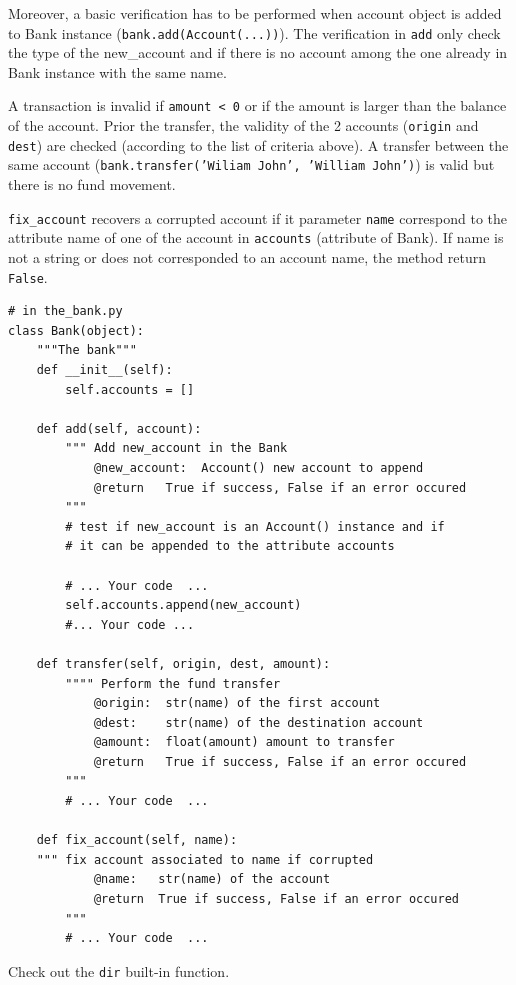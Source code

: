 \documentclass{42-en}
\begin{document}
Moreover, a basic verification has to be performed when account object is added to Bank instance
(\texttt{bank.add(Account(...))}).
The verification in \texttt{add} only check the type of the new\_account and
if there is no account among the one already in Bank instance with the same name.

A transaction is invalid if \texttt{amount < 0} or if the amount is larger than
the balance of the account.
Prior the transfer, the validity of the 2 accounts (\texttt{origin} and \texttt{dest}) are checked
(according to the list of criteria above).
A transfer between the same account (\texttt{bank.transfer('Wiliam John', 'William John')})
is valid but there is no fund movement.

\texttt{fix\_account} recovers a corrupted account if it parameter \texttt{name} correspond to the attribute
name of one of the account in \texttt{accounts} (attribute of Bank). If name is not a string or does not corresponded
to an account name, the method return \texttt{False}.

\begin{verbatim}
# in the_bank.py
class Bank(object):
    """The bank"""
    def __init__(self):
        self.accounts = []

    def add(self, account):
        """ Add new_account in the Bank
            @new_account:  Account() new account to append
            @return   True if success, False if an error occured
        """
        # test if new_account is an Account() instance and if 
        # it can be appended to the attribute accounts
        
        # ... Your code  ...
        self.accounts.append(new_account)
        #... Your code ...

    def transfer(self, origin, dest, amount):
        """" Perform the fund transfer
            @origin:  str(name) of the first account
            @dest:    str(name) of the destination account
            @amount:  float(amount) amount to transfer
            @return   True if success, False if an error occured
        """
        # ... Your code  ...

    def fix_account(self, name):
    """ fix account associated to name if corrupted
            @name:   str(name) of the account
            @return  True if success, False if an error occured
        """
        # ... Your code  ...
\end{verbatim}

Check out the \texttt{dir} built-in function.
\end{document}
